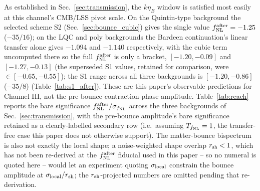\documentclass[aps,prd,twocolumn,superscriptaddress,nofootinbib,longbibliography]{revtex4-2}
\newcommand{\fnl}{f_{\rm NL}}
\begin{document}
As established in Sec.~\ref{sec:transmission}, the $k\eta_B$
window is satisfied most easily at this channel's CMB/LSS pivot scale. On
the Quintin-type background the selected scheme S2
(Sec.~\ref{sec:bounce_cubic}) gives the single value
$\fnl^{\rm after}=-1.25$ ($-35/16$); on the LQC and poly backgrounds the
Bardeen continuation's linear transfer alone gives $-1.094$ and $-1.140$
respectively, with the cubic term uncomputed there so the full
$\fnl^{\rm after}$ is only a bracket, $[-1.20,-0.09]$ and $[-1.27,-0.13]$
(the superseded S1 values, retained for comparison, were
$\in[-0.65,-0.55]$); the S1 range across all three backgrounds is
$[-1.20,-0.86]$ ($-35/8$) (Table~\ref{tab:s1_after}). These are this paper's observable predictions
for Channel III, not the pre-bounce contraction-phase amplitude. Table~\ref{tab:reach} reports the
bare significance $\fnl^{\rm after}/\sigma_{\fnl}$ across the three
backgrounds of Sec.~\ref{sec:transmission}, with the pre-bounce amplitude's
bare significance retained as a clearly-labelled secondary row (i.e.\
assuming $T_{\fnl}=1$, the transfer-free case this paper does not otherwise
support). The matter-bounce bispectrum is also not exactly the local shape;
a noise-weighted shape overlap $r_{\rm sh}<1$, which has not been re-derived at the
$\fnl^{\rm after}$ fiducial used in this paper -- so no numeral is quoted
here -- would let an experiment quoting
$\sigma_{\rm local}$ constrain the bounce amplitude at $\sigma_{\rm
local}/r_{\rm sh}$; the $r_{\rm sh}$-projected numbers are omitted pending that re-derivation.
\end{document}
